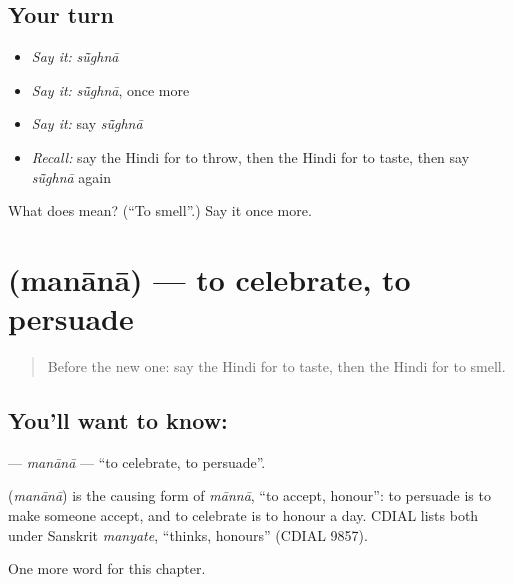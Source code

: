 \subsection*{Your turn}
\begin{itemize}
\raggedright
  \item \emph{Say it:} \emph{sū̃ghnā}
  \item \emph{Say it:} \emph{sū̃ghnā}, once more
  \item \emph{Say it:} say \emph{sū̃ghnā}
  \item \emph{Recall:} say the Hindi for to throw, then the Hindi for to taste, then say \emph{sū̃ghnā} again
\end{itemize}

\begin{tcolorbox}[breakable,colback=teal!4,colframe=teal!35!black,title={Before you move on}]
What does  mean? (\textquotedblleft{}To smell\textquotedblright{}.) Say it once more.
\end{tcolorbox}
\section[\texorpdfstring{\hi{मनाना} (manānā)}{मनाना (manānā)}]{ (manānā) — to celebrate, to persuade}

\label{lesson:HI-C177-manana}



\begin{quote}
Before the new one: say the Hindi for to taste, then the Hindi for to smell.
\end{quote}

\subsection*{You'll want to know: }
\textbf{} — \emph{manānā} — \textquotedblleft{}to celebrate, to persuade\textquotedblright{}.

\begin{cousinweb}
\textbf{} (\emph{manānā}) is the causing form of \emph{mānnā}, \textquotedblleft{}to accept, honour\textquotedblright{}: to persuade is to make someone accept, and to celebrate is to honour a day. CDIAL lists both under Sanskrit \emph{manyate}, \textquotedblleft{}thinks, honours\textquotedblright{} (CDIAL 9857).
\end{cousinweb}

\begin{grammarlens}[title={What you've built}]
One more word for this chapter.
\end{grammarlens}

